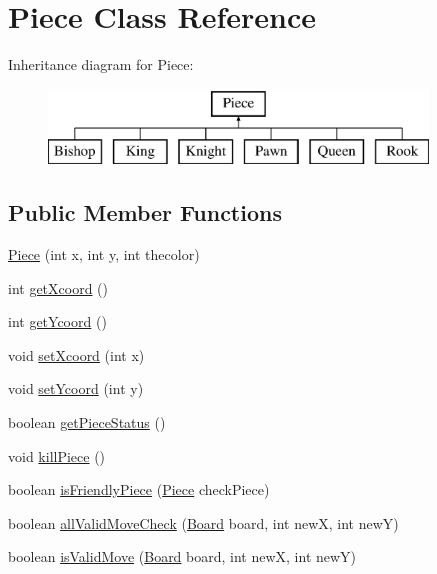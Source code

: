 \hypertarget{class_piece}{}\section{Piece Class Reference}
\label{class_piece}
Inheritance diagram for Piece\+:\begin{figure}[H]
\begin{center}
\leavevmode
\includegraphics[height=2.000000cm]{class_piece}
\end{center}
\end{figure}
\subsection*{Public Member Functions}
\begin{DoxyCompactItemize}
\item 
\mbox{\hyperlink{class_piece_a06b07b1389155f1c3831d3b16d38b277}{Piece}} (int x, int y, int thecolor)
\item 
int \mbox{\hyperlink{class_piece_a4d677038e42f41c49c7295d87f5944ee}{get\+Xcoord}} ()
\item 
int \mbox{\hyperlink{class_piece_a04d3706f690288a0ed9f3c16fd29e6dd}{get\+Ycoord}} ()
\item 
void \mbox{\hyperlink{class_piece_abf82df6a19b7223227e04b74427eea6d}{set\+Xcoord}} (int x)
\item 
void \mbox{\hyperlink{class_piece_a6618c10a34b92fbe2d99d932475f8321}{set\+Ycoord}} (int y)
\item 
boolean \mbox{\hyperlink{class_piece_a15e1f1efe5a71b953cffa8d402f69be6}{get\+Piece\+Status}} ()
\item 
void \mbox{\hyperlink{class_piece_a266466a5d102e18261a160c900f4570f}{kill\+Piece}} ()
\item 
boolean \mbox{\hyperlink{class_piece_a453be38e2005fee525f297fe3cfec0f0}{is\+Friendly\+Piece}} (\mbox{\hyperlink{class_piece}{Piece}} check\+Piece)
\item 
boolean \mbox{\hyperlink{class_piece_ad63ab469b35468ad133a3ea3626eb4e1}{all\+Valid\+Move\+Check}} (\mbox{\hyperlink{class_board}{Board}} board, int newX, int newY)
\item 
boolean \mbox{\hyperlink{class_piece_ac4cf6701c965e80a20ade44cfa0003a4}{is\+Valid\+Move}} (\mbox{\hyperlink{class_board}{Board}} board, int newX, int newY)
\end{DoxyCompactItemize}
